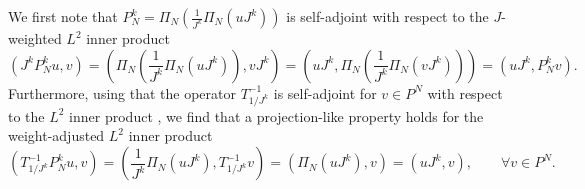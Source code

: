 \documentclass[preprint,10pt]{article}
\theoremstyle{definition}
\theoremstyle{lemma}
\theoremstyle{theorem}
\theoremstyle{assumption}
\newcommand{\LRp}[1]{\left( #1 \right)}
\begin{document}
{We first note that $P_N^k  = \Pi_N\LRp{\frac{1}{J^k}\Pi_N\LRp{uJ^k}}$ is self-adjoint with respect to the $J$-weighted $L^2$ inner product
\begin{equation}
\LRp{J^k P_N^k  u, v} = \LRp{\Pi_N\LRp{\frac{1}{J^k}\Pi_N\LRp{uJ^k}}, vJ^k} = \LRp{uJ^k, \Pi_N\LRp{\frac{1}{J^k}\Pi_N\LRp{vJ^k}}} =  \LRp{uJ^k, P_N^k  v}.
\label{eq:PNsym}
\end{equation}
Furthermore, using that the operator $T_{1/J^k}^{-1}$ is self-adjoint for $v \in P^N$ with respect to the $L^2$ inner product \cite{chan2016weight1}, we find that a projection-like property holds for the weight-adjusted $L^2$ inner product
\begin{equation}
\LRp{T_{1/J^k}^{-1} P_N^k  u,v} = \LRp{ \frac{1}{J^k}\Pi_N(uJ^k),T_{1/J^k}^{-1}v} = \LRp{\Pi_N(u J^k),v} = \LRp{u J^k,v}, \qquad \forall v\in P^N.
\label{eq:PNproj}
\end{equation}

}
\end{document}
